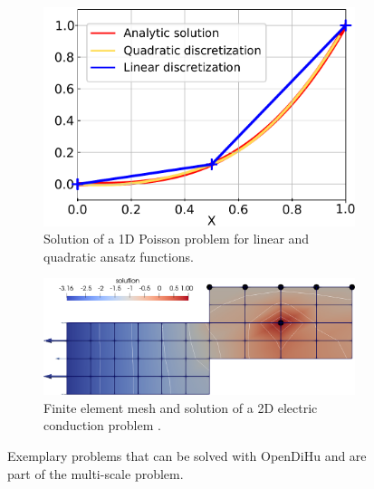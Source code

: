 \begin{figure}
  \centering%
  \begin{subfigure}[t]{0.38\textwidth}%
    \centering%
    \includegraphics[width=\textwidth]{images/results/basic/analytic.pdf}%
    \caption{Solution of a 1D Poisson problem for linear and quadratic ansatz functions.}%
    \label{fig:poisson}%
  \end{subfigure}\quad
  \begin{subfigure}[t]{0.58\textwidth}%
    \centering%
    \includegraphics[width=\textwidth]{images/results/basic/laplace_composite_1.png}%
    \caption{Finite element mesh and solution of a 2D electric conduction problem .}%
    \label{fig:laplace_composite_1}%
  \end{subfigure}
  \caption{Exemplary problems that can be solved with OpenDiHu and are part of the multi-scale problem.}%
  \label{fig:poisson_laplace_composite_1}%
\end{figure}%

